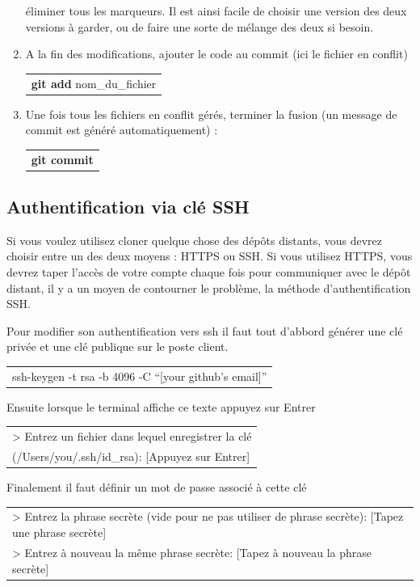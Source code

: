 \documentclass[a4paper,10pt]{article}
\begin{document}
\begin{spacing}{1.5}
\begin{enumerate}
éliminer tous les marqueurs. Il est ainsi facile de choisir une version des deux
versions à garder, ou de faire une sorte de mélange des deux si besoin.
\item A la fin des modifications, ajouter le code au commit (ici le fichier en conflit)
\begin{center}
  \begin{tabular}{c}
    \rowcolor{lightgray!50!white}
      \textbf{git add} nom\_du\_fichier
  \end{tabular}
\end{center}
\item Une fois tous les fichiers en conflit gérés, terminer la fusion (un message de commit est généré automatiquement) :
\begin{center}
  \begin{tabular}{c}
    \rowcolor{lightgray!50!white}
      \textbf{git commit}
  \end{tabular}
\end{center}
\end{enumerate}

\subsection*{Authentification via clé SSH}
Si vous voulez utilisez cloner quelque chose des dépôts distants, vous devrez choisir entre un des deux moyens : HTTPS ou SSH. Si vous utilisez HTTPS, vous devrez taper l'accès de votre compte chaque fois pour communiquer avec le dépôt distant, il y a un moyen de contourner le problème, la méthode d'authentification SSH.

Pour modifier son authentification vers ssh il faut tout d'abbord générer une
clé privée et une clé publique sur le poste client.
\begin{center}
  \begin{tabular}{c}
    \rowcolor{lightgray!50!white}
      ssh-keygen -t rsa -b 4096 -C ``[your github's email]''
  \end{tabular}
\end{center}
Ensuite lorsque le terminal affiche ce texte appuyez sur Entrer
\begin{center}
  \begin{tabular}{l}
    \rowcolor{lightgray!50!white}
    > Entrez un fichier dans lequel enregistrer la clé\\
    \rowcolor{lightgray!50!white}
    (/Users/you/.ssh/id\_rsa): [Appuyez sur Entrer]
  \end{tabular}
\end{center}
Finalement il faut définir un mot de passe associé à cette clé
\begin{center}
  \begin{tabular}{l}
    \rowcolor{lightgray!50!white}
    > Entrez la phrase secrète (vide pour ne pas utiliser de phrase secrète): [Tapez une phrase secrète] \\
    \rowcolor{lightgray!50!white}
    > Entrez à nouveau la même phrase secrète: [Tapez à nouveau la phrase secrète]
  \end{tabular}
\end{center}


\end{spacing}
\end{document}
